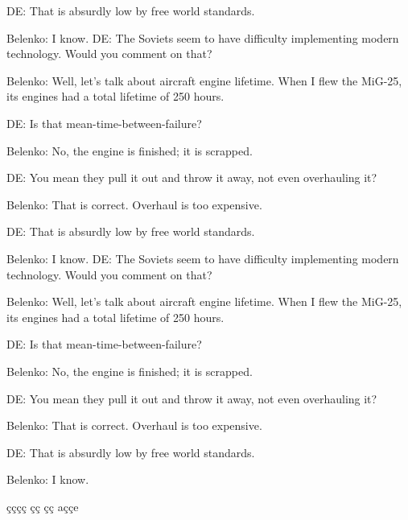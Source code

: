 DE:  That is absurdly low by free world standards.

Belenko:  I know.
DE:  The Soviets seem to have difficulty implementing modern technology.
     Would you comment on that?

Belenko:  Well, let's talk about aircraft engine lifetime.  When I flew the
          MiG-25, its engines had a total lifetime of 250 hours.

DE:  Is that mean-time-between-failure?

Belenko:  No, the engine is finished; it is scrapped.

DE:  You mean they pull it out and throw it away, not even overhauling it?

Belenko:  That is correct.  Overhaul is too expensive.

DE:  That is absurdly low by free world standards.

Belenko:  I know.
DE:  The Soviets seem to have difficulty implementing modern technology.
     Would you comment on that?

Belenko:  Well, let's talk about aircraft engine lifetime.  When I flew the
          MiG-25, its engines had a total lifetime of 250 hours.

DE:  Is that mean-time-between-failure?

Belenko:  No, the engine is finished; it is scrapped.

DE:  You mean they pull it out and throw it away, not even overhauling it?

Belenko:  That is correct.  Overhaul is too expensive.

DE:  That is absurdly low by free world standards.

Belenko:  I know.



çççç çç çç aççe
